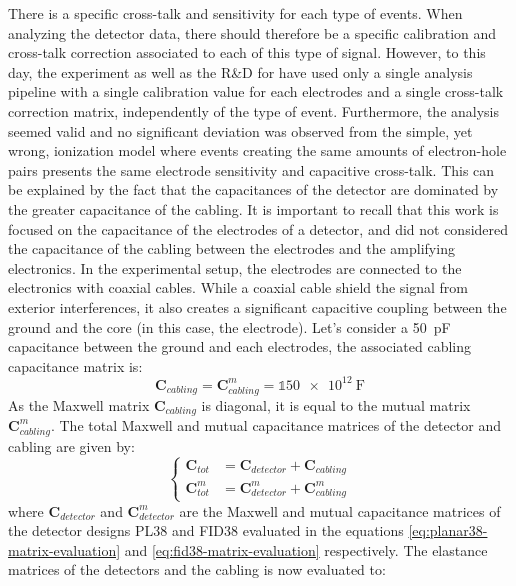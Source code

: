 There is a specific cross-talk and sensitivity for each type of events. When analyzing the detector data, there should therefore be a specific calibration and cross-talk correction associated to each of this type of signal.
However, to this day, the \Edelweiss{} experiment as well as the R\&D for \Ricochet{} have used only a single analysis pipeline with a single calibration value for each electrodes and a single cross-talk correction matrix, independently of the type of event. Furthermore, the analysis seemed valid and no significant deviation was observed from the simple, yet wrong, ionization model where events creating the same amounts of electron-hole pairs presents the same electrode sensitivity and capacitive cross-talk. This can be explained by the fact that the capacitances of the detector are dominated by the greater capacitance of the cabling. It is important to recall that this work is focused on the capacitance of the electrodes of a detector, and did not considered the capacitance of the cabling between the electrodes and the amplifying electronics. In the experimental setup, the electrodes are connected to the electronics with coaxial cables. While a coaxial cable shield the signal from exterior interferences, it also creates a significant capacitive coupling between the ground and the core (in this case, the electrode). Let's consider a \SI{50}{\pico\farad} capacitance between the ground and each electrodes, the associated cabling capacitance matrix is:
\begin{equation}
\bm{C}_{cabling} = \bm{C}_{cabling}^m = \mathbb{1} \SI{50e12}{\farad}
\end{equation}
As the Maxwell matrix $\bm{C}_{cabling}$ is diagonal, it is equal to the mutual matrix $\bm{C}_{cabling}^m$. The total Maxwell and mutual capacitance matrices of the detector and cabling are given by:
\begin{equation}
\label{eq:cabling-capacitance}
\begin{cases} 
\bm{C}_{tot} &= \bm{C}_{detector} + \bm{C}_{cabling} \\
\bm{C}_{tot}^m &= \bm{C}_{detector}^m + \bm{C}_{cabling}^m
\end{cases}
\end{equation}
where $\bm{C}_{detector}$ and $\bm{C}_{detector}^m$ are the Maxwell and mutual capacitance matrices of the detector designs PL38 and FID38 evaluated in the equations \ref{eq:planar38-matrix-evaluation} and \ref{eq:fid38-matrix-evaluation} respectively.
The elastance matrices of the detectors and the cabling is now evaluated to:


